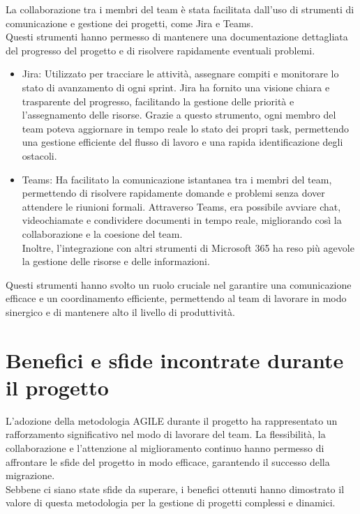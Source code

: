La collaborazione tra i membri del team è stata facilitata dall'uso di strumenti
di comunicazione e gestione dei progetti, come Jira e Teams.\\ Questi strumenti
hanno permesso di mantenere una documentazione dettagliata del progresso del
progetto e di risolvere rapidamente eventuali problemi.
\begin{itemize}
  \item Jira: Utilizzato per tracciare le attività, assegnare compiti e monitorare
    lo stato di avanzamento di ogni sprint. Jira ha fornito una visione chiara e
    trasparente del progresso, facilitando la gestione delle priorità e l'assegnamento
    delle risorse. Grazie a questo strumento, ogni membro del team poteva aggiornare
    in tempo reale lo stato dei propri task, permettendo una gestione efficiente
    del flusso di lavoro e una rapida identificazione degli ostacoli.

  \item Teams: Ha facilitato la comunicazione istantanea tra i membri del team, permettendo
    di risolvere rapidamente domande e problemi senza dover attendere le riunioni
    formali. Attraverso Teams, era possibile avviare chat, videochiamate e
    condividere documenti in tempo reale, migliorando così la collaborazione e la
    coesione del team.\\ Inoltre, l'integrazione con altri strumenti di
    Microsoft 365 ha reso più agevole la gestione delle risorse e delle
    informazioni.
\end{itemize}
Questi strumenti hanno svolto un ruolo cruciale nel garantire una comunicazione efficace
e un coordinamento efficiente, permettendo al team di lavorare in modo sinergico
e di mantenere alto il livello di produttività.

\section{Benefici e sfide incontrate durante il progetto}
\label{sec:benefici_sfide_agile}

L'adozione della metodologia AGILE durante il progetto ha rappresentato un rafforzamento
significativo nel modo di lavorare del team. La flessibilità, la collaborazione e
l'attenzione al miglioramento continuo hanno permesso di affrontare le sfide del
progetto in modo efficace, garantendo il successo della migrazione.\\ Sebbene ci
siano state sfide da superare, i benefici ottenuti hanno dimostrato il valore di
questa metodologia per la gestione di progetti complessi e dinamici.

